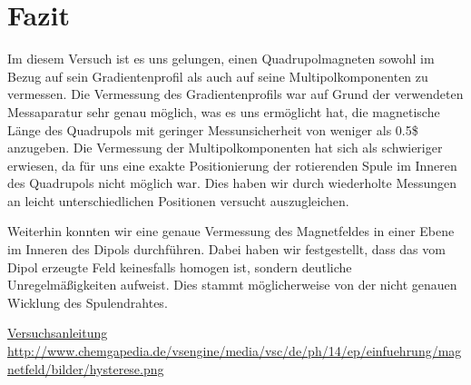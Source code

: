 \documentclass[bigchapter,colorback,accentcolor=tud4b,linedtoc,11pt]{tudreport}
\begin{document}
\chapter{Fazit}
Im diesem Versuch ist es uns gelungen, einen Quadrupolmagneten sowohl im Bezug auf sein Gradientenprofil als auch auf seine Multipolkomponenten zu vermessen. Die Vermessung des Gradientenprofils war auf Grund der verwendeten Messaparatur sehr genau möglich, was es uns ermöglicht hat, die magnetische Länge des Quadrupols mit geringer Messunsicherheit von weniger als 0.5\$ anzugeben. Die Vermessung der Multipolkomponenten hat sich als schwieriger erwiesen, da für uns eine exakte Positionierung der rotierenden Spule im Inneren des Quadrupols nicht möglich war. Dies haben wir durch wiederholte Messungen an leicht unterschiedlichen Positionen versucht auszugleichen.

Weiterhin konnten wir eine genaue Vermessung des Magnetfeldes in einer Ebene im Inneren des Dipols durchführen. Dabei haben wir festgestellt, dass das vom Dipol erzeugte Feld keinesfalls homogen ist, sondern deutliche Unregelmäßigkeiten aufweist. Dies stammt möglicherweise von der nicht genauen Wicklung des Spulendrahtes.

\cleardoublepage{}
\newpage
\begin{thebibliography}{100}
   \url{Versuchsanleitung}
   \url{http://www.chemgapedia.de/vsengine/media/vsc/de/ph/14/ep/einfuehrung/magnetfeld/bilder/hysterese.png}
\end{thebibliography}
\end{document}
